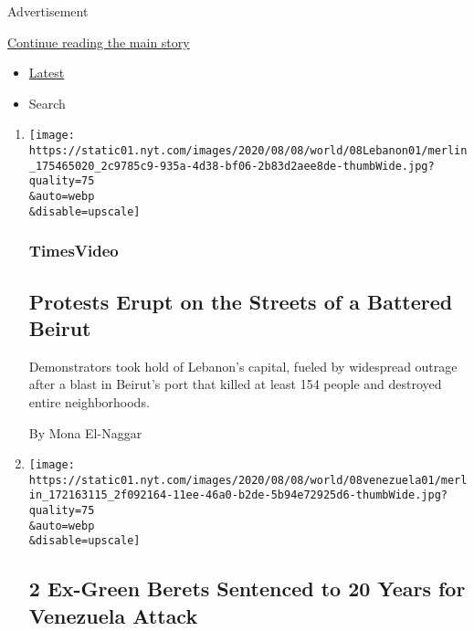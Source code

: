 Advertisement

\protect\hyperlink{after-mid3}{Continue reading the main story}

\begin{itemize}
\tightlist
\item
  \protect\hyperlink{stream-panel}{Latest}
\item
  Search
\end{itemize}

\begin{enumerate}
\def\labelenumi{\arabic{enumi}.}
\item
  \href{/video/world/100000007279742/beirut-explosion-lebanon-protests.html}{}

  \texttt{[image: https://static01.nyt.com/images/2020/08/08/world/08Lebanon01/merlin\_175465020\_2c9785c9-935a-4d38-bf06-2b83d2aee8de-thumbWide.jpg?quality=75\\\&auto=webp\\\&disable=upscale]}

  \hypertarget{timesvideo}{%
  \subsubsection{TimesVideo}\label{timesvideo}}

  \hypertarget{protests-erupt-on-the-streets-of-a-battered-beirut}{%
  \subsection{Protests Erupt on the Streets of a Battered
  Beirut}\label{protests-erupt-on-the-streets-of-a-battered-beirut}}

  Demonstrators took hold of Lebanon's capital, fueled by widespread
  outrage after a blast in Beirut's port that killed at least 154 people
  and destroyed entire neighborhoods.

  By Mona El-Naggar
\item
  \href{/2020/08/08/world/americas/2-ex-green-berets-sentenced-to-20-years-for-venezuela-attack.html}{}

  \texttt{[image: https://static01.nyt.com/images/2020/08/08/world/08venezuela01/merlin\_172163115\_2f092164-11ee-46a0-b2de-5b94e72925d6-thumbWide.jpg?quality=75\\\&auto=webp\\\&disable=upscale]}

  \hypertarget{2-ex-green-berets-sentenced-to-20-years-for-venezuela-attack}{%
  \subsection{2 Ex-Green Berets Sentenced to 20 Years for Venezuela
  Attack}\label{2-ex-green-berets-sentenced-to-20-years-for-venezuela-attack}}


\end{enumerate}
